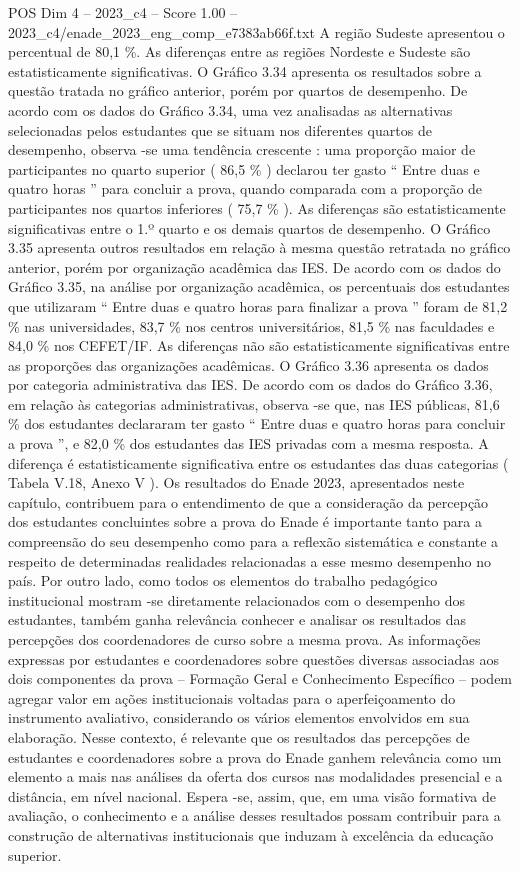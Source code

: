 \begin{textsample}{POS Dim 4 – 2023\_c4 – Score 1.00 – 2023\_c4/enade\_2023\_eng\_comp\_e7383ab66f.txt}
A região Sudeste apresentou o percentual de 80,1 \%.
As diferenças entre as regiões Nordeste e Sudeste são estatisticamente significativas.
O Gráfico 3.34 apresenta os resultados sobre a questão tratada no gráfico anterior, porém por quartos de desempenho.
De acordo com os dados do Gráfico 3.34, uma vez analisadas as alternativas selecionadas pelos estudantes que se situam nos diferentes quartos de desempenho, observa -se uma tendência crescente : uma proporção maior de participantes no quarto superior ( 86,5 \% ) declarou ter gasto “ Entre duas e quatro horas ” para concluir a prova, quando comparada com a proporção de participantes nos quartos inferiores ( 75,7 \% ).
As diferenças são estatisticamente significativas entre o 1.º quarto e os demais quartos de desempenho.
O Gráfico 3.35 apresenta outros resultados em relação à mesma questão retratada no gráfico anterior, porém por organização acadêmica das IES.
De acordo com os dados do Gráfico 3.35, na análise por organização acadêmica, os percentuais dos estudantes que utilizaram “ Entre duas e quatro horas para finalizar a prova ” foram de 81,2 \% nas universidades, 83,7 \% nos centros universitários, 81,5 \% nas faculdades e 84,0 \% nos CEFET/IF.
As diferenças não são estatisticamente significativas entre as proporções das organizações acadêmicas.
O Gráfico 3.36 apresenta os dados por categoria administrativa das IES.
De acordo com os dados do Gráfico 3.36, em relação às categorias administrativas, observa -se que, nas IES públicas, 81,6 \% dos estudantes declararam ter gasto “ Entre duas e quatro horas para concluir a prova ”, e 82,0 \% dos estudantes das IES privadas com a mesma resposta.
A diferença é estatisticamente significativa entre os estudantes das duas categorias ( Tabela V.18, Anexo V ).
Os resultados do Enade 2023, apresentados neste capítulo, contribuem para o entendimento de que a consideração da percepção dos estudantes concluintes sobre a prova do Enade é importante tanto para a compreensão do seu desempenho como para a reflexão sistemática e constante a respeito de determinadas realidades relacionadas a esse mesmo desempenho no país.
Por outro lado, como todos os elementos do trabalho pedagógico institucional mostram -se diretamente relacionados com o desempenho dos estudantes, também ganha relevância conhecer e analisar os resultados das percepções dos coordenadores de curso sobre a mesma prova.
As informações expressas por estudantes e coordenadores sobre questões diversas associadas aos dois componentes da prova – Formação Geral e Conhecimento Específico – podem agregar valor em ações institucionais voltadas para o aperfeiçoamento do instrumento avaliativo, considerando os vários elementos envolvidos em sua elaboração.
Nesse contexto, é relevante que os resultados das percepções de estudantes e coordenadores sobre a prova do Enade ganhem relevância como um elemento a mais nas análises da oferta dos cursos nas modalidades presencial e a distância, em nível nacional.
Espera -se, assim, que, em uma visão formativa de avaliação, o conhecimento e a análise desses resultados possam contribuir para a construção de alternativas institucionais que induzam à excelência da educação superior.

\end{textsample}
